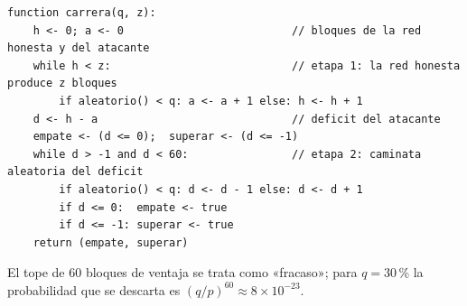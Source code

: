 \documentclass[11pt,a4paper]{article}
\begin{document}
\begin{lstlisting}[language=pseudo]
function carrera(q, z):
    h <- 0; a <- 0                          // bloques de la red honesta y del atacante
    while h < z:                            // etapa 1: la red honesta produce z bloques
        if aleatorio() < q: a <- a + 1 else: h <- h + 1
    d <- h - a                              // deficit del atacante
    empate <- (d <= 0);  superar <- (d <= -1)
    while d > -1 and d < 60:                // etapa 2: caminata aleatoria del deficit
        if aleatorio() < q: d <- d - 1 else: d <- d + 1
        if d <= 0:  empate <- true
        if d <= -1: superar <- true
    return (empate, superar)
\end{lstlisting}

El tope de 60 bloques de ventaja se trata como «fracaso»; para $q=30\,\%$ la probabilidad que se descarta es $(q/p)^{60}\approx 8\times10^{-23}$.
\end{document}

